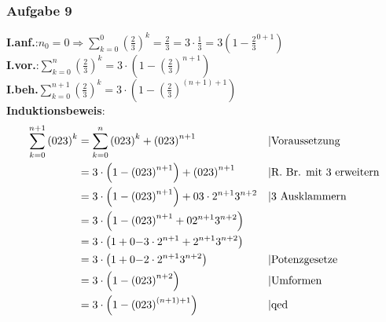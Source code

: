 \subsubsection{Aufgabe 9}
\textbf{I.anf.}:\quad$ n_0 = 0 \Rightarrow \sum_{k=0}^0 \left(\frac{2}{3}\right)^k = \frac{2}{3} = 3\cdot \frac{1}{3} = 3\left(1-\frac{2}{3}^{0+1}\right)$\\
\textbf{I.vor.}:\quad$\sum_{k=0}^n \left(\frac{2}{3}\right)^k = 3 \cdot \left(1 - \left(\frac{2}{3}\right)^{n+1}\right)$ \\
\textbf{I.beh.}\quad$ \sum_{k=0}^{n+1} \left(\frac{2}{3}\right)^k = 3 \cdot \left(1 - \left(\frac{2}{3}\right)^{(n+1)+1}\right) $\\
\textbf{Induktionsbeweis}:\begin{align*} 
\sum_{k=0}^{n+1} \left(\frac{2}{3}\right)^k &= \sum_{k=0}^n \left(\frac{2}{3}\right)^k + \left(\frac{2}{3}\right)^{n+1} && \text{\textbar Voraussetzung}\\
																						&= 3 \cdot \left(1 - \left(\frac{2}{3}\right)^{n+1}\right) + \left(\frac{2}{3}\right)^{n+1} && \text{\textbar R. Br. mit $3$ erweitern}\\
																						&= 3 \cdot \left(1 - \left(\frac{2}{3}\right)^{n+1}\right) + \frac{3 \cdot 2^{n+1}}{3^{n+2}} && \text{\textbar $3$ Ausklammern}\\
																						&= 3 \cdot \left(1 - \left(\frac{2}{3}\right)^{n+1} + \frac{2^{n+1}}{3^{n+2}}\right) \\
																						&= 3 \cdot \left(1 + \frac{-3 \cdot 2^{n+1} + 2^{n+1}}{3^{n+2}} \right) \\
																						&= 3 \cdot \left(1 + \frac{-2 \cdot 2^{n+1}}{3^{n+2}} \right) && \text{\textbar Potenzgesetze}\\
																						&= 3 \cdot \left(1 - \left(\frac{2}{3}\right)^{n+2} \right) && \text{\textbar Umformen}\\
																						&= 3 \cdot \left(1 - \left(\frac{2}{3}\right)^{(n+1)+1} \right) && \text{\textbar qed}\end{align*}	
